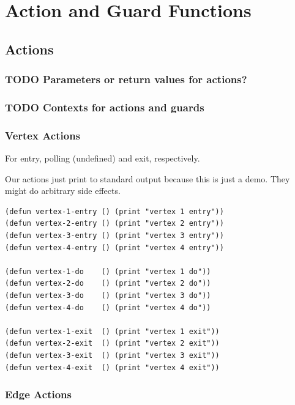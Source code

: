 \documentclass[10pt,oneside,x11names]{article}
\begin{document}
\section{Action and Guard Functions}
\label{sec:org1497fc9}

\subsection{Actions}
\label{sec:orgb3a22ab}

\subsubsection{{\bfseries\sffamily TODO} Parameters or return values for actions?}
\label{sec:org7679c94}

\subsubsection{{\bfseries\sffamily TODO} Contexts for actions and guards}
\label{sec:org6ab7017}

\subsubsection{Vertex Actions}
\label{sec:orge65f317}

For entry, polling (undefined) and exit, respectively.

Our actions just print to standard output because this is just a demo.  They
might do arbitrary side effects.

\begin{verbatim}
(defun vertex-1-entry () (print "vertex 1 entry"))
(defun vertex-2-entry () (print "vertex 2 entry"))
(defun vertex-3-entry () (print "vertex 3 entry"))
(defun vertex-4-entry () (print "vertex 4 entry"))

(defun vertex-1-do    () (print "vertex 1 do"))
(defun vertex-2-do    () (print "vertex 2 do"))
(defun vertex-3-do    () (print "vertex 3 do"))
(defun vertex-4-do    () (print "vertex 4 do"))

(defun vertex-1-exit  () (print "vertex 1 exit"))
(defun vertex-2-exit  () (print "vertex 2 exit"))
(defun vertex-3-exit  () (print "vertex 3 exit"))
(defun vertex-4-exit  () (print "vertex 4 exit"))
\end{verbatim}

\subsubsection{Edge Actions}
\label{sec:org98dbcee}
\end{document}
